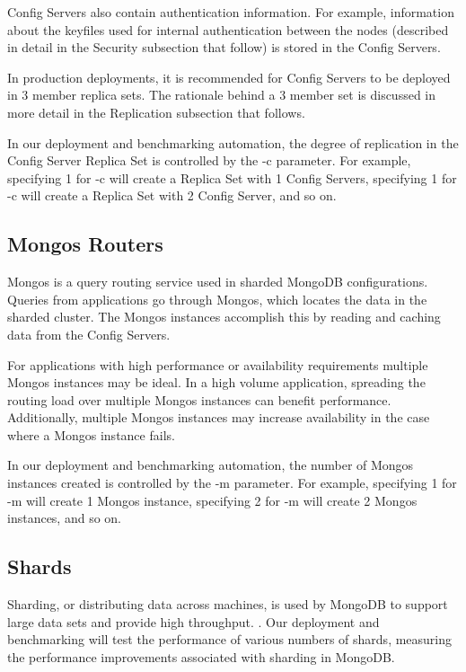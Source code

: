 \documentclass[9pt,twocolumn,twoside]{styles/osajnl}
\begin{document}
Config Servers also contain authentication information.  For example, information about the keyfiles used for internal authentication between the nodes (described in detail in the Security subsection that follow) is stored in the Config Servers. \cite{www-mongoConfig}

In production deployments, it is recommended for Config Servers to be deployed in 3 member replica sets. \cite{www-mongoComponents}  The rationale behind a 3 member set is discussed in more detail in the Replication subsection that follows.

In our deployment and benchmarking automation, the degree of replication in the Config Server Replica Set is controlled by the -c parameter.  For example, specifying 1 for -c will create a Replica Set with 1 Config Servers, specifying 1 for -c will create a Replica Set with 2 Config Server, and so on. 

\subsection{Mongos Routers}

Mongos is a query routing service used in sharded MongoDB configurations.  Queries from applications go through Mongos, which locates the data in the sharded cluster. The Mongos instances accomplish this by reading and caching data from the Config Servers. \cite{www-mongoMongos} 

For applications with high performance or availability requirements multiple Mongos instances may be ideal.  In a high volume application, spreading the routing load over multiple Mongos instances can benefit performance.  Additionally, multiple Mongos instances may increase availability in the case where a Mongos instance fails. \cite{www-mongoConfig}

In our deployment and benchmarking automation, the number of Mongos instances created is controlled by the -m parameter.  For example, specifying 1 for -m will create 1 Mongos instance, specifying 2 for -m will create 2 Mongos instances, and so on. 


\subsection{Shards}

Sharding, or distributing data across machines, is used by MongoDB to support large data sets and provide high throughput. \cite{www-sharding}.  Our deployment and benchmarking will test the performance of various numbers of shards, measuring the performance improvements associated with sharding in MongoDB.
\end{document}
